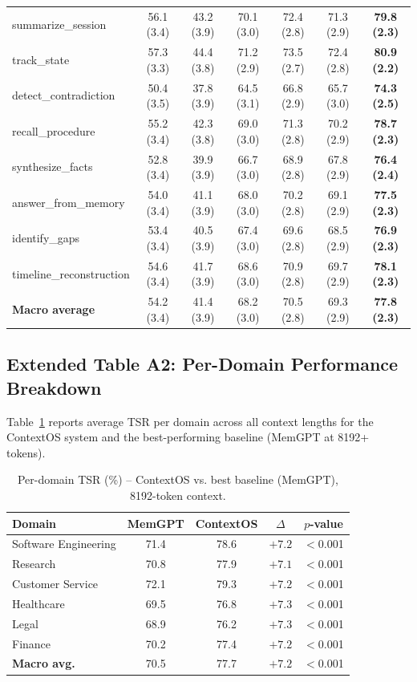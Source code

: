 \begin{table}[h!]
\begin{tabular}{@{}lcccccc@{}}
\midrule
summarize\_session       & 56.1 (3.4) & 43.2 (3.9) & 70.1 (3.0) & 72.4 (2.8) & 71.3 (2.9) & \textbf{79.8 (2.3)} \\
track\_state             & 57.3 (3.3) & 44.4 (3.8) & 71.2 (2.9) & 73.5 (2.7) & 72.4 (2.8) & \textbf{80.9 (2.2)} \\
detect\_contradiction    & 50.4 (3.5) & 37.8 (3.9) & 64.5 (3.1) & 66.8 (2.9) & 65.7 (3.0) & \textbf{74.3 (2.5)} \\
recall\_procedure        & 55.2 (3.4) & 42.3 (3.8) & 69.0 (3.0) & 71.3 (2.8) & 70.2 (2.9) & \textbf{78.7 (2.3)} \\
synthesize\_facts        & 52.8 (3.4) & 39.9 (3.9) & 66.7 (3.0) & 68.9 (2.8) & 67.8 (2.9) & \textbf{76.4 (2.4)} \\
answer\_from\_memory     & 54.0 (3.4) & 41.1 (3.9) & 68.0 (3.0) & 70.2 (2.8) & 69.1 (2.9) & \textbf{77.5 (2.3)} \\
identify\_gaps           & 53.4 (3.4) & 40.5 (3.9) & 67.4 (3.0) & 69.6 (2.8) & 68.5 (2.9) & \textbf{76.9 (2.3)} \\
timeline\_reconstruction & 54.6 (3.4) & 41.7 (3.9) & 68.6 (3.0) & 70.9 (2.8) & 69.7 (2.9) & \textbf{78.1 (2.3)} \\
\midrule
\textbf{Macro average}   & 54.2 (3.4) & 41.4 (3.9) & 68.2 (3.0) & 70.5 (2.8) & 69.3 (2.9) & \textbf{77.8 (2.3)} \\
\bottomrule
\end{tabular}
\end{table}

\subsection{Extended Table A2: Per-Domain Performance Breakdown}

Table~\ref{tab:app_domain_perf} reports average TSR per domain across all
context lengths for the ContextOS system and the best-performing baseline
(MemGPT at 8192+ tokens).

\begin{table}[h!]
\centering
\caption{Per-domain TSR (\%) -- ContextOS vs. best baseline (MemGPT), 8192-token context.}
\label{tab:app_domain_perf}
\begin{tabular}{@{}lcccc@{}}
\toprule
\textbf{Domain} & \textbf{MemGPT} & \textbf{ContextOS} & \textbf{$\Delta$} & \textbf{$p$-value} \\
\midrule
Software Engineering & 71.4 & 78.6 & $+7.2$ & $<$0.001 \\
Research             & 70.8 & 77.9 & $+7.1$ & $<$0.001 \\
Customer Service     & 72.1 & 79.3 & $+7.2$ & $<$0.001 \\
Healthcare           & 69.5 & 76.8 & $+7.3$ & $<$0.001 \\
Legal                & 68.9 & 76.2 & $+7.3$ & $<$0.001 \\
Finance              & 70.2 & 77.4 & $+7.2$ & $<$0.001 \\
\midrule
\textbf{Macro avg.} & 70.5 & 77.7 & $+7.2$ & $<$0.001 \\
\bottomrule
\end{tabular}
\end{table}

